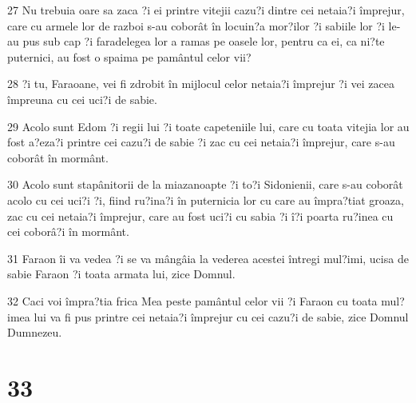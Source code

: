 \par 27 Nu trebuia oare sa zaca ?i ei printre vitejii cazu?i dintre cei netaia?i împrejur, care cu armele lor de razboi s-au coborât în locuin?a mor?ilor ?i sabiile lor ?i le-au pus sub cap ?i faradelegea lor a ramas pe oasele lor, pentru ca ei, ca ni?te puternici, au fost o spaima pe pamântul celor vii?
\par 28 ?i tu, Faraoane, vei fi zdrobit în mijlocul celor netaia?i împrejur ?i vei zacea împreuna cu cei uci?i de sabie.
\par 29 Acolo sunt Edom ?i regii lui ?i toate capeteniile lui, care cu toata vitejia lor au fost a?eza?i printre cei cazu?i de sabie ?i zac cu cei netaia?i împrejur, care s-au coborât în mormânt.
\par 30 Acolo sunt stapânitorii de la miazanoapte ?i to?i Sidonienii, care s-au coborât acolo cu cei uci?i ?i, fiind ru?ina?i în puternicia lor cu care au împra?tiat groaza, zac cu cei netaia?i împrejur, care au fost uci?i cu sabia ?i î?i poarta ru?inea cu cei coborâ?i în mormânt.
\par 31 Faraon îi va vedea ?i se va mângâia la vederea acestei întregi mul?imi, ucisa de sabie Faraon ?i toata armata lui, zice Domnul.
\par 32 Caci voi împra?tia frica Mea peste pamântul celor vii ?i Faraon cu toata mul?imea lui va fi pus printre cei netaia?i împrejur cu cei cazu?i de sabie, zice Domnul Dumnezeu.

\chapter{33}

